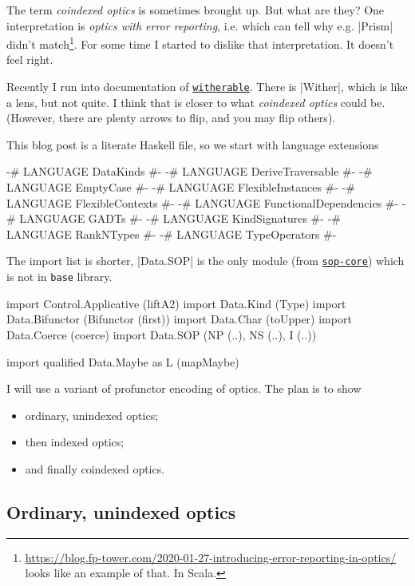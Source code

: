 The term \emph{coindexed optics} is sometimes brought up.
But what are they?
One interpretation is \emph{optics with error reporting},
i.e. which can tell why e.g. |Prism| didn't match\footnote{%
\url{https://blog.fp-tower.com/2020-01-27-introducing-error-reporting-in-optics/} looks like an example of that. In Scala.
}.
For some time I started to dislike that interpretation.
It doesn't feel right.

Recently I run into documentation of
\href{https://hackage.haskell.org/package/witherable}{\texttt{witherable}}.
There is |Wither|, which is like a lens, but not quite.
I think that is closer to what \emph{coindexed optics} could be.
(However, there are plenty arrows to flip, and you may flip others).

This blog post is a literate Haskell file, so we start with
language extensions

\begin{code}
{-# LANGUAGE DataKinds #-}
{-# LANGUAGE DeriveTraversable #-}
{-# LANGUAGE EmptyCase #-}
{-# LANGUAGE FlexibleInstances #-}
{-# LANGUAGE FlexibleContexts #-}
{-# LANGUAGE FunctionalDependencies #-}
{-# LANGUAGE GADTs #-}
{-# LANGUAGE KindSignatures #-}
{-# LANGUAGE RankNTypes #-}
{-# LANGUAGE TypeOperators #-}
\end{code}

The import list is shorter,
|Data.SOP| is the only module (from
\href{https://hackage.haskell.org/package/sop-core}{\texttt{sop-core}})
which is not in \texttt{base} library.

\begin{code}
import Control.Applicative (liftA2)
import Data.Kind           (Type)
import Data.Bifunctor      (Bifunctor (first))
import Data.Char           (toUpper)
import Data.Coerce         (coerce)
import Data.SOP            (NP (..), NS (..), I (..))

import qualified Data.Maybe as L (mapMaybe)
\end{code}

I will use a variant of profunctor encoding of optics. The plan is to show
\begin{itemize}
\item ordinary, unindexed optics;
\item then indexed optics;
\item and finally coindexed optics.
\end{itemize}

\subsection{Ordinary, unindexed optics}

